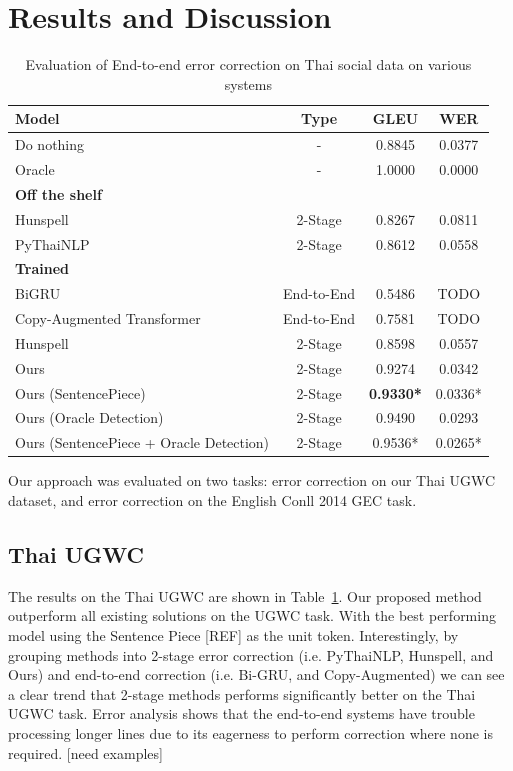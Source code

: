 
\section{Results and Discussion}

\begin{table}
  \caption{Evaluation of End-to-end error correction on Thai social data on various systems}
  \begin{tabular}{lccc}
    \toprule
    Model & Type & GLEU & WER \\
    \midrule
    Do nothing & - & 0.8845 & 0.0377 \\
    Oracle & - & 1.0000 & 0.0000 \\
    \midrule
    \textbf{Off the shelf} & \\
    Hunspell & 2-Stage & 0.8267 & 0.0811 \\
    PyThaiNLP & 2-Stage & 0.8612 & 0.0558 \\
    \midrule
    \textbf{Trained} & \\
    BiGRU & End-to-End & 0.5486 & TODO \\
    Copy-Augmented Transformer & End-to-End & 0.7581 & TODO \\
    Hunspell & 2-Stage & 0.8598 & 0.0557 \\
    \midrule
    Ours & 2-Stage & 0.9274 & 0.0342 \\
    Ours (SentencePiece) & 2-Stage & \textbf{0.9330*} & 0.0336* \\
    Ours (Oracle Detection) & 2-Stage & 0.9490 & 0.0293 \\
    Ours (SentencePiece + Oracle Detection) & 2-Stage & 0.9536* & 0.0265* \\
    \bottomrule
  \end{tabular}
  \label{tab:e2e_ugwc}
\end{table}

Our approach was evaluated on two tasks: error correction on our Thai UGWC dataset, and error correction on the English Conll 2014 GEC task.

\subsection{Thai UGWC}

The results on the Thai UGWC are shown in Table~\ref{tab:e2e_ugwc}. Our proposed method outperform all existing solutions on the UGWC task. With the best performing model using the Sentence Piece [REF] as the unit token. Interestingly, by grouping methods into 2-stage error correction (i.e. PyThaiNLP, Hunspell, and Ours) and end-to-end correction (i.e. Bi-GRU, and Copy-Augmented) we can see a clear trend that 2-stage methods performs significantly better on the Thai UGWC task. Error analysis shows that the end-to-end systems have trouble processing longer lines due to its eagerness to perform correction where none is required. [need examples]

